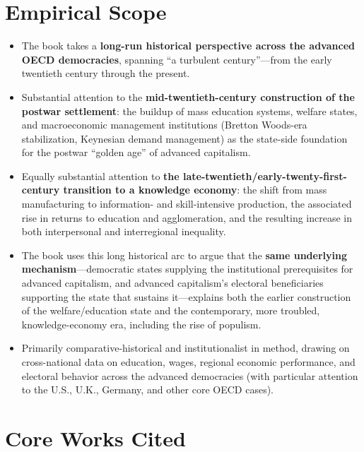 \documentclass[12pt]{article}
\begin{document}
\section{Empirical Scope}

\begin{itemize}[leftmargin=*, itemsep=4pt]
    \item The book takes a \textbf{long-run historical perspective across the advanced OECD democracies}, spanning ``a turbulent century''---from the early twentieth century through the present.
    \item Substantial attention to the \textbf{mid-twentieth-century construction of the postwar settlement}: the buildup of mass education systems, welfare states, and macroeconomic management institutions (Bretton Woods-era stabilization, Keynesian demand management) as the state-side foundation for the postwar ``golden age'' of advanced capitalism.
    \item Equally substantial attention to \textbf{the late-twentieth/early-twenty-first-century transition to a knowledge economy}: the shift from mass manufacturing to information- and skill-intensive production, the associated rise in returns to education and agglomeration, and the resulting increase in both interpersonal and interregional inequality.
    \item The book uses this long historical arc to argue that the \textbf{same underlying mechanism}---democratic states supplying the institutional prerequisites for advanced capitalism, and advanced capitalism's electoral beneficiaries supporting the state that sustains it---explains both the earlier construction of the welfare/education state and the contemporary, more troubled, knowledge-economy era, including the rise of populism.
    \item Primarily comparative-historical and institutionalist in method, drawing on cross-national data on education, wages, regional economic performance, and electoral behavior across the advanced democracies (with particular attention to the U.S., U.K., Germany, and other core OECD cases).
\end{itemize}

\section{Core Works Cited}
\end{document}

